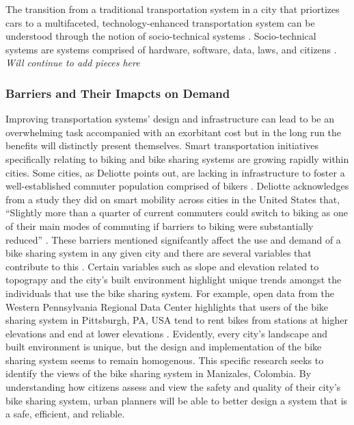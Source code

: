 \documentclass[12pt]{article}
\begin{document}
The transition from a traditional transportation system in a city that priortizes cars to a multifaceted, technology-enhanced transportation system
can be understood through the notion of socio-technical systems \cite{SmartTransportation}. Socio-technical systems are systems comprised of hardware, software,
data, laws, and citizens \cite{GeeksForGeeks}. 
\textit{Will continue to add pieces here}
\subsubsection*{Barriers and Their Imapcts on Demand}
Improving transportation systems’ design and infrastructure can lead to be an 
overwhelming task accompanied with an exorbitant cost but in the long run the benefits will distinctly present themselves. 
Smart transportation initiatives specifically relating to biking and bike sharing systems are growing rapidly within
cities. Some cities, as Deliotte points out, are lacking in infrastructure to foster a well-established commuter population comprised of 
bikers \cite{DeliotteReport}. Deliotte acknowledges from a study they did on smart mobility across cities in the United States that, “Slightly 
more than a quarter of current commuters could switch to biking as one of their main modes of commuting if barriers 
to biking were substantially reduced” \cite{DeliotteReport}. These barriers mentioned signifcantly affect the use and demand of a bike sharing system in any given city and 
there are several variables that contribute to this \cite{ReviewonBike-sharing}. Certain variables such as slope and elevation related to topograpy and the city's built environment
highlight unique trends amongst the individuals that use the bike sharing system. For example, open data from the Western Pennsylvania Regional Data Center
highlights that users of the bike sharing system in Pittsburgh, PA, USA tend to rent bikes from stations at higher elevations and end at lower elevations \cite{HealthyRidePGHPSG}. Evidently,
every city's landscape and built environment is unique, but the design and implementation of the bike sharing system seems to remain homogenous. This specific research seeks to identify the views
of the bike sharing system in Manizales, Colombia. By understanding how citizens assess and view the 
safety and quality of their city's bike sharing system, urban planners will be able to better design a system that is a safe, efficient, and reliable.
\end{document}
